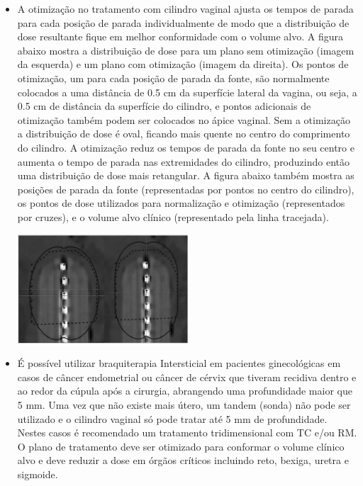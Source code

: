 \documentclass[11pt,a4paper]{article}
\newcounter{exemplo}
\begin{document}
\begin{exemplo}[Braquiterapia]
\begin{itemize}
        \item A otimização no tratamento com cilindro vaginal ajusta os tempos de parada para cada posição de parada individualmente de modo que a distribuição de dose resultante fique em melhor conformidade com o volume alvo. A figura abaixo mostra a distribuição de dose para um plano sem otimização (imagem da esquerda) e um plano com otimização (imagem da direita). Os pontos de otimização, um para cada posição de parada da fonte, são normalmente colocados a uma distância de 0.5 cm da superfície lateral da vagina, ou seja, a 0.5 cm de distância da superfície do cilindro, e pontos adicionais de otimização também podem ser colocados no ápice vaginal. Sem a otimização  a distribuição de dose é oval, ficando mais quente no centro do comprimento do cilindro. A otimização reduz os tempos de parada da fonte no seu centro e aumenta o tempo de parada nas extremidades do cilindro, produzindo então uma distribuição de dose mais retangular. A figura abaixo também mostra as posições de parada da fonte (representadas por pontos no centro do cilindro), os pontos de dose utilizados para normalização e otimização (representados por cruzes), e o volume alvo clínico (representado pela linha tracejada).

            \begin{center}
                \includegraphics[width=0.5\textwidth]{Imagens/cilindroDose.JPG}
            \end{center}
            
        \item É possível utilizar braquiterapia Intersticial em pacientes ginecológicas em casos de câncer endometrial ou câncer de cérvix que tiveram recidiva dentro e ao redor da cúpula após a cirurgia, abrangendo uma profundidade maior que 5 mm. Uma vez que não existe mais útero, um tandem (sonda) não pode ser utilizado e o cilindro vaginal só pode tratar até 5 mm de profundidade. Nestes casos é recomendado um tratamento tridimensional com TC e/ou RM. O plano de tratamento deve ser otimizado para conformar o volume clínico alvo e deve reduzir a dose em órgãos críticos incluindo reto, bexiga, uretra e sigmoide.
        

\end{itemize}
\end{exemplo}
\end{document}
